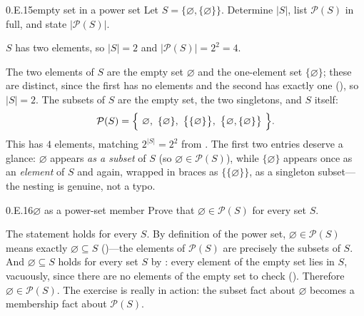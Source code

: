 \documentclass[main.tex]{subfiles}
\begin{document}
\begin{Exercise}{0.E.15}{empty set in a power set}
Let $S=\{\varnothing,\{\varnothing\}\}$. Determine $\lvert S\rvert$, list $\mathcal P(S)$ in full, and
state $\lvert\mathcal P(S)\rvert$.
\end{Exercise}
\begin{Solution}
$S$ has two elements, so $\lvert S\rvert=2$ and $\lvert\mathcal P(S)\rvert=2^{2}=4$.

The two elements of $S$ are the empty set $\varnothing$ and the one-element set $\{\varnothing\}$;
these are distinct, since the first has no elements and the second has exactly one (), so
$\lvert S\rvert=2$. The subsets of $S$ are the empty set, the two singletons, and $S$ itself:
\[
\mathcal P(S)=\Bigl\{\ \varnothing,\ \{\varnothing\},\ \bigl\{\{\varnothing\}\bigr\},\
\bigl\{\varnothing,\{\varnothing\}\bigr\}\ \Bigr\}.
\]
This has $4$ elements, matching $2^{\lvert S\rvert}=2^{2}$ from . The first two entries
deserve a glance: $\varnothing$ appears \emph{as a subset} of $S$ (so $\varnothing\in\mathcal P(S)$),
while $\{\varnothing\}$ appears once as an \emph{element} of $S$ and again, wrapped in braces as
$\{\{\varnothing\}\}$, as a singleton subset---the nesting is genuine, not a typo.
\end{Solution}

\begin{Exercise}{0.E.16}{$\varnothing$ as a power-set member}
Prove that $\varnothing\in\mathcal P(S)$ for every set $S$.
\end{Exercise}
\begin{Solution}
The statement holds for every $S$. By definition of the power set, $\varnothing\in\mathcal P(S)$ means
exactly $\varnothing\subseteq S$ (\xref{0.3.15})---the elements of $\mathcal P(S)$ are precisely the
subsets of $S$. And $\varnothing\subseteq S$ holds for every set $S$ by \xref{0.3.8}: every element of
the empty set lies in $S$, vacuously, since there are no elements of the empty set to check
(\xref{0.1.6}). Therefore $\varnothing\in\mathcal P(S)$. The exercise is really  in
action: the subset fact about $\varnothing$ becomes a membership fact about $\mathcal P(S)$.
\end{Solution}
\end{document}
